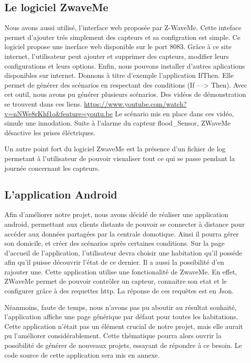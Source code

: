 \subsection{Le logiciel ZwaveMe}
Nous avons aussi utilisé, l'interface web proposée par Z-WaveMe.
Cette inteface permet d'ajouter trés simplement des capteurs et sa configration est simple.
Ce logiciel propose une inerface web disponible sur le port 8083. Grâce à ce site internet, l'utilisateur peut ajouter et supprimer des capteurs, modifier leurs configurations et leurs options.
Enfin, nous pouvons installer d'autres aplications disponibles sur internet. 
Donnons à titre d'exemple l'application IfThen. Elle permet de générer des scénarios en respectant des conditions (If ---> Then). Avec cet outil, nous avons pu générer plusieurs scénarios. Des vidéos de démonstration se trouvent dans ces liens.\newline
\url{https://www.youtube.com/watch?v=nNWe8rKhf1o&feature=youtu.be}
Le scénario mis en place dans ces vidéo, simule une innodation. Suite à l'alarme du capteur flood\_Sensor, ZWaveMe désactive les prises éléctriques. 

Un autre point fort du logiciel ZwaveMe est la présence d'un fichier de log permetant à l'utilisateur de pouvoir visualiser tout ce qui se passe pendant la journée concernant les capteurs.

\subsection{L'application Android}
Afin d'améliorer notre projet, nous avons décidé de réaliser une application android, permettant aux clients distants de pouvoir se connecter à distance pour accéder aux données partagées par la centrale domotique. Ainsi il pourra gérer son domicile, et créer des scénarios après certaines conditions. Sur la page d'accueil de l'application, l'utilisateur devra choisir une habitation qu'il posséde afin qu'il puisse découvrir l'état de ce dernier. Il a aussi la possibilité d'en rajouter une.\newline
Cette application utilise une fonctionalité de ZwaveMe. En effet, ZWaveMe permet de pouvoir contrôler un capteur, connaitre son etat et le configurer grâce à des requettes http. 
La réponse de ces requêtes est en Json. 


Néanmoins, faute de temps, nous n'avons pas pu aboutir au résultat souhaité, l'application affiche une page générique par défaut pour toutes les habitations. Cette application n'était pas un élément crucial de notre projet, mais elle aurait pu l'améliorer considérablement. Cette thématique pourra alors ouvrir la possibilité de générer de nouveaux projets, essayant de répondre à ce besoin.\newline
Le code source de cette application sera mis en annexe.\newline


